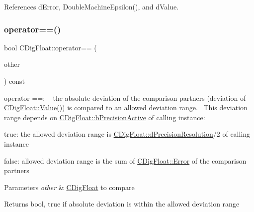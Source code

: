 References d\+Error, Double\+Machine\+Epsilon(), and d\+Value.

\mbox{\label{classCDigFloat_ad8980d984bf2bab71d15b830fd0180a5}} 
\subsubsection{\texorpdfstring{operator==()}{operator==()}\hspace{0.1cm}{\footnotesize\ttfamily [1/2]}}
{\footnotesize\ttfamily bool C\+Dig\+Float\+::operator== (\begin{DoxyParamCaption}\item[{const \hyperlink{classCDigFloat}{C\+Dig\+Float} \&}]{other }\end{DoxyParamCaption}) const}



operator ==\+: ~\newline
 the absolute deviation of the comparison partners (deviation of \hyperlink{classCDigFloat_af74b8cd0935294b6371f551b7a1ff640}{C\+Dig\+Float\+::\+Value()}) is compared to an allowed deviation range.~\newline
 This deviation range depends on \hyperlink{classCDigFloat_aa1f6ed0312a2aa6ae5ee2abd195adefc}{C\+Dig\+Float\+::b\+Precision\+Active} of calling instance\+: 


\begin{DoxyItemize}
\item true\+: the allowed deviation range is \hyperlink{classCDigFloat_a7f9809fa0b25da57f5c8c18a02b7d1a7}{C\+Dig\+Float\+::d\+Precision\+Resolution}/2 of calling instance
\item false\+: allowed deviation range is the sum of \hyperlink{classCDigFloat_aca8ded79bec9c18f5be1cbbbee59f066}{C\+Dig\+Float\+::\+Error} of the comparison partners
\end{DoxyItemize}


\begin{DoxyParams}{Parameters}
{\em other} & \hyperlink{classCDigFloat}{C\+Dig\+Float} to compare \\
\hline
\end{DoxyParams}
\begin{DoxyReturn}{Returns}
bool, true if absolute deviation is within the allowed deviation range 
\end{DoxyReturn}


